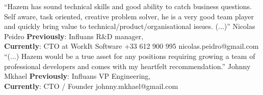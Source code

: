 %
%
%

\twocolumnsection
{
        {“Hazem has sound technical skills and good ability to catch business questions. Self aware, task oriented, creative problem solver, he is a very good team player and quickly bring value to technical/product/organisational issues. (...)”}
        {Nicolas Peidro}
        {\textbf{Previously}: Influans R\&D manager, \\ \textbf{Currently}: CTO at WorkIt Software}
	    {+33 612 900 995}
	    {nicolas.peidro@gmail.com}
}
{
        {“(...) Hazem would be a true asset for any positions requiring growing a team of professional developers and comes with my heartfelt recommendation.”}  
        {Johnny Mkhael}
    	{\textbf{Previously}: Influans VP Engineering, \\ \textbf{Currently}: CTO / Founder}
    	{johnny.mkhael@gmail.com}
        {}
}